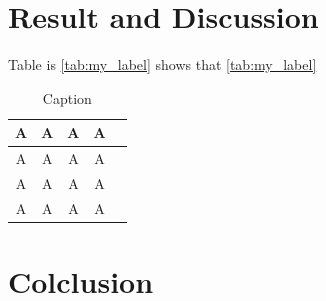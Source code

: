 \documentclass[10pt]{article}
\begin{document}
\newpage
\section{Result and Discussion}

Table is \autoref{tab:my_label} shows that \autoref{tab:my_label}



\begin{table}[H]
    \centering
    \begin{tabular}{|c|c|c|c|c|} \hline
        A & A & A & A \\ \hline
        A & A & A & A \\ \hline
        A & A & A & A \\ \hline
        A & A & A & A \\ \hline
    \end{tabular}
    \caption{Caption}
    \label{tab:my_label}
\end{table}




















































\newpage
\section{Colclusion}
\end{document}
